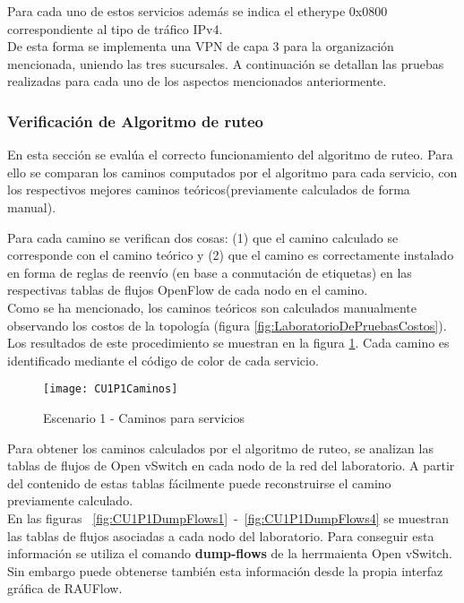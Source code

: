 Para cada uno de estos servicios adem\'as se indica el etherype 0x0800 correspondiente al tipo de tr\'afico IPv4.\\

De esta forma se implementa una VPN de capa 3 para la organizaci\'on mencionada, uniendo las tres sucursales. A continuaci\'on se detallan las pruebas realizadas para cada uno de los aspectos mencionados anteriormente.

\subsubsection{Verificaci\'on de Algoritmo de ruteo}
En esta secci\'on se eval\'ua el correcto funcionamiento del algoritmo de ruteo. Para ello se comparan los caminos computados por el algoritmo para cada servicio, con los respectivos mejores caminos te\'oricos(previamente calculados de forma manual). 

Para cada camino se verifican dos cosas: (1) que el camino calculado se corresponde con el camino te\'orico y (2) que el camino es correctamente instalado en forma de reglas de reenvío (en base a conmutaci\'on de etiquetas) en las respectivas tablas de flujos OpenFlow de cada nodo en el camino.\\

Como se ha mencionado, los caminos te\'oricos son calculados manualmente observando los costos de la topolog\'ia (figura \ref{fig:LaboratorioDePruebasCostos}). Los resultados de este procedimiento se muestran en la figura \ref{fig:CUP1Caminos}. Cada camino es identificado mediante el código de color de cada servicio.\\

\begin{figure}[ht!] 
\centering    
\texttt{[image: CU1P1Caminos]}
\caption[Escenario 1 - Caminos para servicios]{Escenario 1 - Caminos para servicios}
\label{fig:CUP1Caminos}
\end{figure}

Para obtener los caminos calculados por el algoritmo de ruteo, se analizan las tablas de flujos de Open vSwitch en cada nodo de la red del laboratorio. A partir del contenido de estas tablas fácilmente puede reconstruirse el camino previamente calculado.\\

En las figuras ~\ref{fig:CU1P1DumpFlows1}~-~\ref{fig:CU1P1DumpFlows4} se muestran las tablas de flujos asociadas a cada nodo del laboratorio. Para conseguir esta informaci\'on se utiliza el comando \textbf{dump-flows} de la herrmaienta Open vSwitch. Sin embargo puede obtenerse tambi\'en esta informaci\'on desde la propia interfaz gr\'afica de RAUFlow.\\

